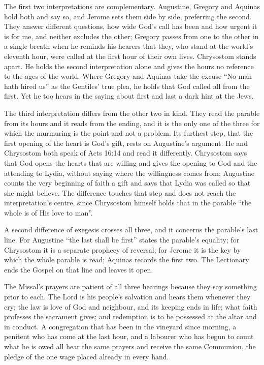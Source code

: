 The first two interpretations are complementary. Augustine, Gregory and
Aquinas hold both and say so, and Jerome sets them side by side, preferring
the second. They answer different questions, how wide God's call has been and
how urgent it is for me, and neither excludes the other; Gregory passes from
one to the other in a single breath when he reminds his hearers that they, who
stand at the world's eleventh hour, were called at the first hour of their own
lives. Chrysostom stands apart. He holds the second interpretation alone and
gives the hours no reference to the ages of the world. Where Gregory and
Aquinas take the excuse ``No man hath hired us'' as the Gentiles' true plea,
he holds that God called all from the first. Yet he too hears in the saying
about first and last a dark hint at the Jews.

The third interpretation differs from the other two in kind. They read the
parable from its hours and it reads from the ending, and it is the only one of
the three for which the murmuring is the point and not a problem. Its
furthest step, that the first opening of the heart is God's gift, rests on
Augustine's argument. He and Chrysostom both speak of Acts 16:14 and read it
differently. Chrysostom says that God opens the hearts that are willing and
gives the opening to God and the attending to Lydia, without saying where the
willingness comes from; Augustine counts the very beginning of faith a gift
and says that Lydia was called so that she might believe. The difference
touches that step and does not reach the interpretation's centre, since
Chrysostom himself holds that in the parable ``the whole is of His love to
man''.

A second difference of exegesis crosses all three, and it concerns the
parable's last line. For Augustine ``the last shall be first'' states the
parable's equality; for Chrysostom it is a separate prophecy of reversal; for
Jerome it is the key by which the whole parable is read; Aquinas records the
first two. The Lectionary ends the Gospel on that line and leaves it open.

The Missal's prayers are patient of all three hearings because they say
something prior to each. The Lord is his people's salvation and hears them
whenever they cry; the law is love of God and neighbour, and its keeping ends
in life; what faith professes the sacrament gives; and redemption is to be
possessed at the altar and in conduct. A congregation that has been in the
vineyard since morning, a penitent who has come at the last hour, and a
labourer who has begun to count what he is owed all hear the same prayers
and receive the same Communion, the pledge of the one wage placed already in
every hand.
